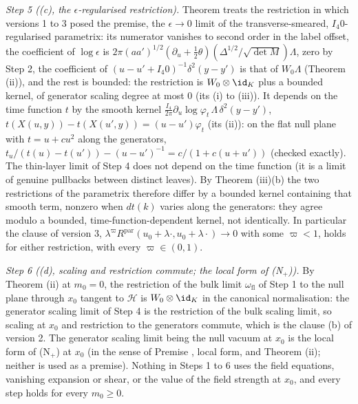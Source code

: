 \emph{Step 5 ((c), the $\epsilon$-regularised restriction).} Theorem  treats the restriction in which versions 1 to 3 posed the premise, the $\epsilon \to 0$ limit of the transverse-smeared, $I_{4}0$-regularised parametrix: its numerator vanishes to second order in the label offset, the coefficient of $\log\epsilon$ is $2\pi(a a')^{1/2}(\partial_{u} + \tfrac12\theta)(\Delta^{1/2}/\sqrt{\det M})\Lambda$, zero by Step 2, the coefficient of $(u - u' + I_{4}0)^{-1}\delta^{2}(y - y')$ is that of $W_{0}\Lambda$ (Theorem (ii)), and the rest is bounded: the restriction is $W_{0}\otimes\id_{K}$ plus a bounded kernel, of generator scaling degree at most $0$ (its (i) to (iii)). It depends on the time function $t$ by the smooth kernel $\tfrac{I_{4}}{2\pi}\partial_{u}\log\varphi_{t}\,\Lambda\,\delta^{2}(y - y')$, $t(X(u, y)) - t(X(u', y)) = (u - u')\varphi_{t}$ (its (ii)): on the flat null plane with $t = u + cu^{2}$ along the generators, $t_{u}/(t(u) - t(u')) - (u - u')^{-1} = c/(1 + c(u + u'))$ (checked exactly). The thin-layer limit of Step 4 does not depend on the time function (it is a limit of genuine pullbacks between distinct leaves). By Theorem (iii)(b) the two restrictions of the parametrix therefore differ by a bounded kernel containing that smooth term, nonzero when $dt(k)$ varies along the generators: they agree modulo a bounded, time-function-dependent kernel, not identically. In particular the clause of version 3, $\lambda^{\varpi}R^{\mathrm{par}}(u_{0} + \lambda\cdot, u_{0} + \lambda\cdot) \to 0$ with some $\varpi < 1$, holds for either restriction, with every $\varpi \in (0, 1)$.

\emph{Step 6 ((d), scaling and restriction commute; the local form of (N$_{+}$)).} By Theorem (ii) at $m_{0} = 0$, the restriction of the bulk limit $\omega_{\mathrm{fl}}$ of Step 1 to the null plane through $x_{0}$ tangent to $\mathcal{H}$ is $W_{0}\otimes\id_{K}$ in the canonical normalisation: the generator scaling limit of Step 4 is the restriction of the bulk scaling limit, so scaling at $x_{0}$ and restriction to the generators commute, which is the clause (b) of version 2. The generator scaling limit being the null vacuum at $x_{0}$ is the local form of (N$_{+}$) at $x_{0}$ (in the sense of Premise , local form, and Theorem (ii); neither is used as a premise). Nothing in Steps 1 to 6 uses the field equations, vanishing expansion or shear, or the value of the field strength at $x_{0}$, and every step holds for every $m_{0} \ge 0$.

